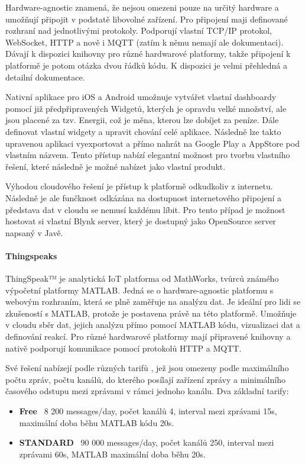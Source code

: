 Hardware-agnostic znamená, že nejsou omezeni pouze na určitý hardware a umožňují připojit v podstatě libovolné zařízení. Pro připojení maji definované rozhraní nad jednotlivými protokoly. Podporují vlastní TCP/IP protokol, WebSocket, HTTP a nově i MQTT (zatím k němu nemají ale dokumentaci). Dávají k dispozici knihovny pro různé hardwarové platformy, takže připojení k platformě je potom otázka dvou řádků kódu. K dispozici je velmi přehledná a detailní dokumentace. \cite{blynk-doc}

Nativní aplikace pro iOS a Android umožnuje vytvářet vlastní dashboardy pomocí již předpřipravených Widgetů, kterých je opravdu velké množství, ale jsou placené za tzv. Energii, což je měna, kterou lze dobíjet za peníze. Dále definovat vlastní widgety a upravit chování celé aplikace. Následně lze takto upravenou aplikaci vyexportovat a přímo nahrát na Google Play a AppStore pod vlastním názvem. Tento přístup nabízí elegantní možnost pro tvorbu vlastního řešení, které následně je možné nabízet jako vlastní produkt. \cite{blynk}

Výhodou cloudového řešení je přístup k platformě odkudkoliv z internetu. Následně je ale funčknost odkázána na dostupnost internetového připojení a představa dat v cloudu se nemusí každému líbit. Pro tento případ je možnost hostovat si vlastní Blynk server, který je dostupný jako OpenSource server napsaný v Javě. \cite{blynk-server}

\paragraph{Thingspeaks}
ThingSpeak™ je analytická IoT platforma od MathWorks, tvůrců známého výpočetní platformy MATLAB. Jedná se o hardware-agnostic platformu s webovým rozhraním, která se plně zaměřuje na analýzu dat. Je ideální pro lidi se zkušeností s MATLAB, protože je postavena právě na této platformě. Umožňuje v cloudu sběr dat, jejich analýzu přímo pomocí MATLAB kódu, vizualizaci dat a definování reakcí. Pro různé hardwarové platformy mají připravené knihovny a nativě podporují komunikace pomocí protokolů HTTP a MQTT. \cite{thingspeaks}

Své řešení nabízejí podle různých tarifů \cite{thingspeaks-pricing}, jež jsou omezeny podle maximálního počtu zpráv, počtu kanálů, do kterého posílají zařízení zprávy a minimálního časového odstupu mezi zprávami v rámci jednoho kanálu. Dva základní tarify:
\begin{itemize}
    \item \textbf{Free} ~8 200 messages/day, počet kanálů 4, interval mezi zprávami 15s, maximální doba běhu MATLAB kódu 20s.
    \item \textbf{STANDARD} ~90 000 messages/day, počet kanálů 250, interval mezi zprávami 60s, MATLAB maximální doba běhu 20s.
\end{itemize}

